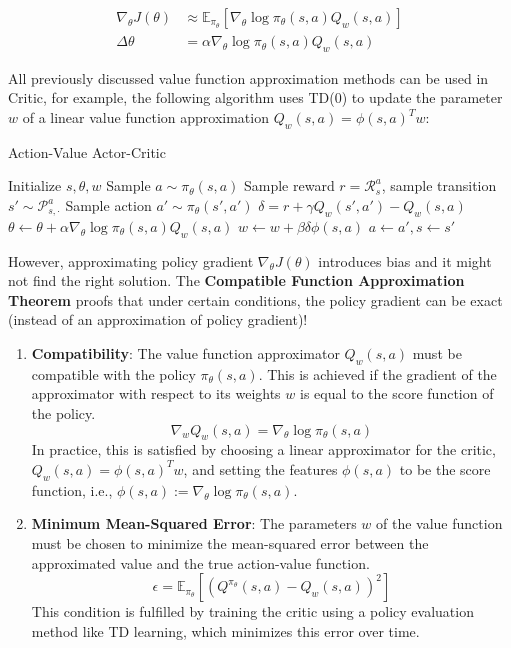 \begin{align*}
    \nabla_\theta J(\theta) & \approx \mathbb{E}_{\pi_\theta}[\nabla_\theta \log \pi_\theta(s, a) Q_w(s, a)] \\
    \Delta \theta           & = \alpha \nabla_\theta \log \pi_\theta(s, a) Q_w(s, a)
\end{align*}

\noindent All previously discussed value function approximation methods can be used in
Critic, for example, the following algorithm uses TD(0) to update the parameter
$w$ of a linear value function approximation $Q_w(s,a) = \phi(s,a)^T w$:

\begin{algorithm}[H]
    \caption{Action-Value Actor-Critic}
    \begin{algorithmic}
        \State Initialize $s, \theta, w$
        \State Sample $a \sim \pi_\theta(s,a)$
        \State Sample reward $r = \mathcal{R}_s^a$, sample transition $s' \sim \mathcal{P}_{s, \cdot}^a$
        \State Sample action $a' \sim \pi_\theta(s', a')$
        \State $\delta = r + \gamma Q_w(s', a') - Q_w(s, a)$
        \State $\theta \leftarrow \theta + \alpha \nabla_\theta \log \pi_\theta(s, a) Q_w(s, a)$
        \State $w \leftarrow w + \beta \delta \phi(s, a)$
        \State $a \leftarrow a', s \leftarrow s'$
        \EndFor
    \end{algorithmic}
\end{algorithm}

\noindent However, approximating policy gradient $\nabla_\theta J(\theta)$ introduces
bias and it might not find the right solution. The \textbf{Compatible Function
    Approximation Theorem} proofs that under certain conditions, the policy
gradient can be exact (instead of an approximation of policy gradient)!

\begin{enumerate}
    \item \textbf{Compatibility}: The value function approximator $Q_w(s,a)$ must be
          compatible with the policy $\pi_\theta(s,a)$. This is achieved if the gradient
          of the approximator with respect to its weights $w$ is equal to the score
          function of the policy.
          \[
              \nabla_w Q_w(s,a) = \nabla_\theta \log \pi_\theta(s,a)
          \]
          In practice, this is satisfied by choosing a linear approximator for the
          critic, $Q_w(s,a) = \phi(s,a)^T w$, and setting the features $\phi(s,a)$ to be
          the score function, i.e., $\phi(s,a) := \nabla_\theta \log \pi_\theta(s,a)$.

    \item \textbf{Minimum Mean-Squared Error}: The parameters $w$ of the value
          function must be chosen to minimize the mean-squared error between the
          approximated value and the true action-value function.
          \[
              \epsilon = \mathbb{E}_{\pi_\theta}[(Q^{\pi_\theta}(s,a) - Q_w(s,a))^2]
          \]
          This condition is fulfilled by training the critic using a policy evaluation
          method like TD learning, which minimizes this error over time.
\end{enumerate}

